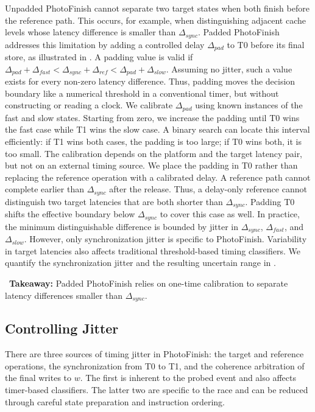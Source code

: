 \documentclass[letterpaper,twocolumn,10pt]{article} %
\newcommand{\AttackName}{PhotoFinish\xspace}
\newcommand{\tprobe}{{\fontfamily{cmtt}\selectfont T0}\xspace}
\newcommand{\tref}{{\fontfamily{cmtt}\selectfont T1}\xspace}
\newcommand{\takeaway}[1]{%
\begin{tcolorbox}[boxsep=1pt,left=2pt,right=2pt,top=1pt,bottom=1pt]
    \faLightbulb[regular]~\textbf{Takeaway:} #1
\end{tcolorbox}
}
\begin{document}
Unpadded \AttackName cannot separate two target states when both finish before the reference path.
This occurs, for example, when distinguishing adjacent cache levels whose latency difference is smaller than $\Delta_{sync}$.
Padded \AttackName addresses this limitation by adding a controlled delay $\Delta_{pad}$ to \tprobe before its final store, as illustrated in .
A padding value is valid if $\Delta_{pad}+\Delta_{fast} < \Delta_{sync}+\Delta_{ref} < \Delta_{pad}+\Delta_{slow}$.
Assuming no jitter, such a value exists for every non-zero latency difference.
Thus, padding moves the decision boundary like a numerical threshold in a conventional timer, but without constructing or reading a clock.
We calibrate $\Delta_{pad}$ using known instances of the fast and slow states.
Starting from zero, we increase the padding until \tprobe wins the fast case while \tref wins the slow case.
A binary search can locate this interval efficiently: if \tref wins both cases, the padding is too large; if \tprobe wins both, it is too small.
The calibration depends on the platform and the target latency pair, but not on an external timing source.
We place the padding in \tprobe rather than replacing the reference operation with a calibrated delay.
A reference path cannot complete earlier than $\Delta_{sync}$ after the release.
Thus, a delay-only reference cannot distinguish two target latencies that are both shorter than $\Delta_{sync}$.
Padding \tprobe shifts the effective boundary below $\Delta_{sync}$ to cover this case as well.
In practice, the minimum distinguishable difference is bounded by jitter in $\Delta_{sync}$, $\Delta_{fast}$, and $\Delta_{slow}$.
However, only synchronization jitter is specific to \AttackName.
Variability in target latencies also affects traditional threshold-based timing classifiers.
We quantify the synchronization jitter and the resulting uncertain range in .

\takeaway{Padded \AttackName relies on one-time calibration to separate latency differences smaller than $\Delta_{sync}$.}

\subsection{Controlling Jitter}\label{subsec:sources-of-imprecision}

There are three sources of timing jitter in \AttackName: the target and reference operations, the synchronization from \tprobe to \tref, and the coherence arbitration of the final writes to $w$.
The first is inherent to the probed event and also affects timer-based classifiers.
The latter two are specific to the race and can be reduced through careful state preparation and instruction ordering.
\end{document}
